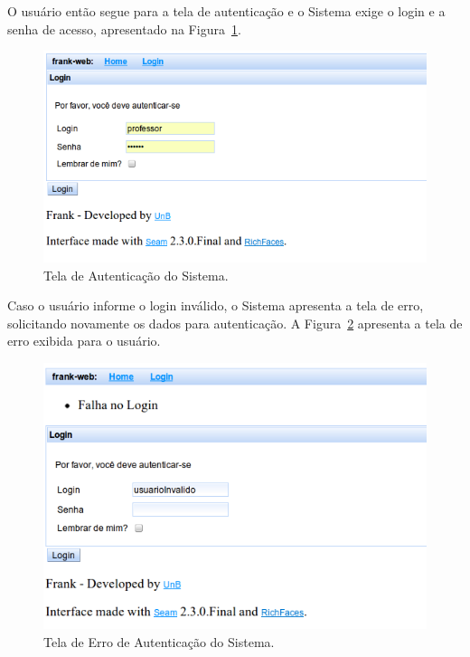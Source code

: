 O usuário então segue para a tela de autenticação e o Sistema exige o login e a senha de acesso, apresentado na Figura~\ref{fig:frank-tela-aluno-login}. 

\begin{figure}
	\centering
	\includegraphics[scale=0.6]{images/frank-tela-aluno-login.png}
	\caption{Tela de Autenticação do Sistema.}
	\label{fig:frank-tela-aluno-login}
\end{figure}

Caso o usuário informe o login inválido, o Sistema apresenta a tela de erro, solicitando novamente os dados para autenticação. A Figura~\ref{fig:frank-tela-login-invalido} apresenta a tela de erro exibida para o usuário.

\begin{figure}
	\centering
	\includegraphics[scale=0.6]{images/frank-tela-login-invalido.png}
	\caption{Tela de Erro de Autenticação do Sistema.}
	\label{fig:frank-tela-login-invalido}
\end{figure}


